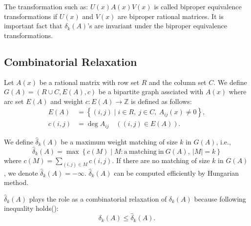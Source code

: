 The transformation such as: $ U(x) A(x) V(x) $ is called biproper equivalence transformations 
if $U(x)$ and $V(x)$ are biproper rational matrices.
It is important fact that $ \delta_k (A) $'s are invariant 
under the biproper equivalence transformations. 

\subsection{Combinatorial Relaxation}
\label{CR}

Let $ A(x) $ be a rational matrix with row set $R$ and the column set $C$. 
We define $ G(A) = ( R \cup C , E(A) , c) $ be a bipartite graph assciated with $ A(x) $ 
where arc set $ E(A) $ and weight $ c : E(A) \to \mathbb{Z}$ is defined as follows:
\begin{align}
E(A) &= \left\{ (i,j) \mid i \in R , \ j \in C , \ A_{ij} (x) \neq 0 \right\},\\
c(i,j) &= \deg A_{ij} \quad ( (i,j) \in E(A) ).
\end{align}

We define $ \hat{\delta}_k (A) $ be a maximum weight matching of size $k$ in $G(A) $, i.e.,
\begin{equation}
\hat{\delta}_k (A) = \max \left\{ c(M) \mid M:\mathrm{a \ matching \  in \ } G(A) ,\ |M| = k \right\}
\end{equation}
where $ c(M) = \sum_{ (i,j) \in M } c (i,j) $. 
If there are no matching of size $k$ in $G(A)$, we denote $ \hat{\delta}_k (A) = - \infty$.
$ \hat{\delta}_k (A) $ can be computed efficiently by Hungarian method\cite{HM}.

$ \hat{\delta}_k (A) $ plays the role as a combinatorial relaxation of $ \delta_k (A) $ 
because following inequality holds(\cite[Theorem 3]{PCRA}):
\begin{equation}
\delta_k (A) \le \hat{\delta}_k (A). \label{ineqd}
\end{equation}

